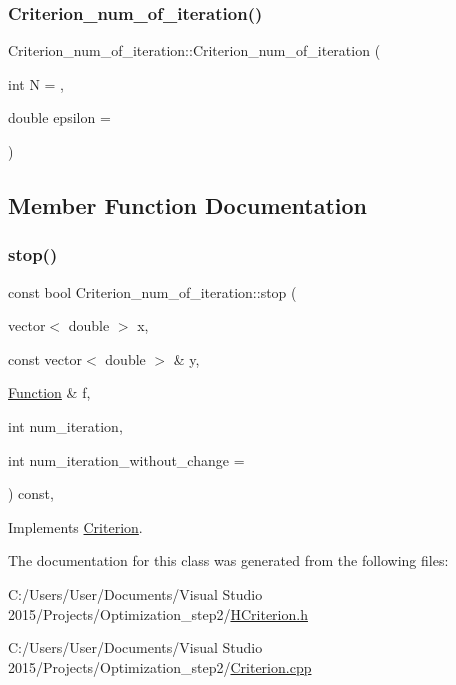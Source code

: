 \subsubsection{\texorpdfstring{Criterion\+\_\+num\+\_\+of\+\_\+iteration()}{Criterion\_num\_of\_iteration()}}
{\footnotesize\ttfamily Criterion\+\_\+num\+\_\+of\+\_\+iteration\+::\+Criterion\+\_\+num\+\_\+of\+\_\+iteration (\begin{DoxyParamCaption}\item[{int}]{N = {},  }\item[{double}]{epsilon = {} }\end{DoxyParamCaption})\hspace{0.3cm}{\ttfamily [inline]}}



\subsection{Member Function Documentation}
\mbox{\label{class_criterion__num__of__iteration_a6566342d95827d9350485498c6c4eba6}} 
\subsubsection{\texorpdfstring{stop()}{stop()}}
{\footnotesize\ttfamily const bool Criterion\+\_\+num\+\_\+of\+\_\+iteration\+::stop (\begin{DoxyParamCaption}\item[{vector$<$ double $>$}]{x,  }\item[{const vector$<$ double $>$ \&}]{y,  }\item[{\hyperlink{class_function}{Function} \&}]{f,  }\item[{int}]{num\+\_\+iteration,  }\item[{int}]{num\+\_\+iteration\+\_\+without\+\_\+change = {} }\end{DoxyParamCaption}) const\hspace{0.3cm}{\ttfamily [override]}, {\ttfamily [virtual]}}



Implements \hyperlink{class_criterion_aee3e2148c665c72c50c2f870a3ca8cdc}{Criterion}.



The documentation for this class was generated from the following files\+:\begin{DoxyCompactItemize}
\item 
C\+:/\+Users/\+User/\+Documents/\+Visual Studio 2015/\+Projects/\+Optimization\+\_\+step2/\hyperlink{_h_criterion_8h}{H\+Criterion.\+h}\item 
C\+:/\+Users/\+User/\+Documents/\+Visual Studio 2015/\+Projects/\+Optimization\+\_\+step2/\hyperlink{_criterion_8cpp}{Criterion.\+cpp}\end{DoxyCompactItemize}
